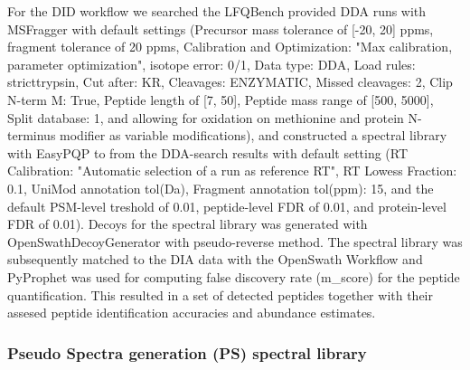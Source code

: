 \documentclass[10pt,letterpaper]{article}
\begin{document}


For the DID workflow we searched the LFQBench provided DDA runs with MSFragger\cite{kong2017msfragger} with default settings (Precursor mass tolerance of [-20, 20] ppms, fragment tolerance of 20 ppms, Calibration and Optimization: "Max calibration, parameter optimization", isotope error: 0/1, Data type: DDA, Load rules: stricttrypsin, Cut after: KR, Cleavages: ENZYMATIC, Missed cleavages: 2, Clip N-term M: True, Peptide length of [7, 50], Peptide mass range of [500, 5000], Split database: 1, and allowing for oxidation on methionine and protein N-terminus modifier as variable modifications), and constructed a spectral library with EasyPQP \cite{easypqp} to from the DDA-search results with default setting (RT Calibration: "Automatic selection of a run as reference RT", RT Lowess Fraction: 0.1, UniMod annotation tol(Da), Fragment annotation tol(ppm): 15, and the default PSM-level treshold of 0.01, peptide-level FDR of 0.01, and protein-level FDR of 0.01). Decoys for the spectral library was generated with OpenSwathDecoyGenerator with pseudo-reverse method. The spectral library was subsequently matched to the DIA data with the OpenSwath Workflow and  PyProphet\cite{teleman2015diana} was used for computing false discovery rate (m\_score) for the peptide quantification. This resulted in a set of detected peptides together with their assesed peptide identification accuracies and abundance estimates.



\subsubsection*{Pseudo Spectra generation (PS) spectral library}
\end{document}
